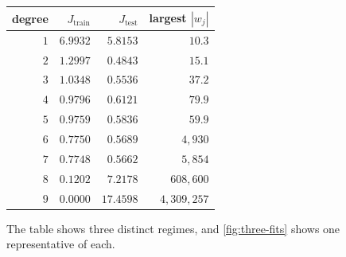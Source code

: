 \begin{center}
\small
\renewcommand{\arraystretch}{1.18}
\begin{tabular}{@{}rrrr@{}}
\toprule
degree & $J_{\text{train}}$ & $J_{\text{test}}$ & largest $|w_j|$\\
\midrule
$1$ & $6.9932$ & $5.8153$ & $10.3$\\
$2$ & $1.2997$ & $\mathbf{0.4843}$ & $15.1$\\
$3$ & $1.0348$ & $0.5536$ & $37.2$\\
$4$ & $0.9796$ & $0.6121$ & $79.9$\\
$5$ & $0.9759$ & $0.5836$ & $59.9$\\
$6$ & $0.7750$ & $0.5689$ & $4{,}930$\\
$7$ & $0.7748$ & $0.5662$ & $5{,}854$\\
$8$ & $0.1202$ & $7.2178$ & $608{,}600$\\
$9$ & $0.0000$ & $17.4598$ & $4{,}309{,}257$\\
\bottomrule
\end{tabular}
\end{center}

The table shows three distinct regimes, and \cref{fig:three-fits} shows one
representative of each.

